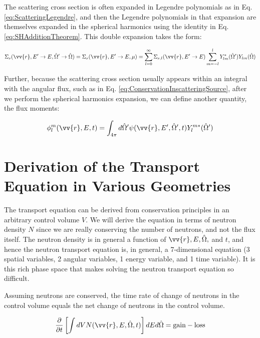 \documentclass[10pt]{article}
\begin{document}
\begin{flushleft}
The scattering cross section is often expanded in Legendre polynomials as in Eq. \ref{eq:ScatteringLegendre}, and then the Legendre polynomials in that expansion are themselves expanded in the spherical harmonics using the identity in Eq. \ref{eq:SHAdditionTheorem}. This double expansion takes the form:

\begin{equation}
\label{eq:ScatteringLegendreandSH}
\Sigma_s(\vv{r}, E'\rightarrow E, \hat{\Omega}'\rightarrow\hat{\Omega}) = \Sigma_s(\vv{r}, E'\rightarrow E, \mu) = \sum_{l=0}^{\infty} \Sigma_{s,l}(\vv{r}, E'\rightarrow E) \sum_{m=-l}^{l} Y_{lm}^{*} (\hat{\Omega}') Y_{lm}(\hat{\Omega})
\end{equation}

Further, because the scattering cross section usually appears within an integral with the angular flux, such as in Eq. \ref{eq:ConservationInscatteringSource}, after we perform the spherical harmonics expansion, we can define another quantity, the flux moments:

\begin{equation}
\label{eq:FluxMomentSH}
\phi_l^m(\vv{r}, E, t) = \int_{4\pi}^{} d\hat{\Omega}'\psi(\vv{r}, E', \hat{\Omega}', t)Y_l^{m*}(\hat{\Omega}')
\end{equation}

\section{Derivation of the Transport Equation in Various Geometries}

The transport equation can be derived from conservation principles in an arbitrary control volume \(V\). We will derive the equation in terms of neutron density \(N\) since we are really conserving the number of neutrons, and not the flux itself. The neutron density is in general a function of \(\vv{r}, E, \hat{\Omega}, \) and \(t\), and hence the neutron transport equation is, in general, a 7-dimensional equation (3 spatial variables, 2 angular variables, 1 energy variable, and 1 time variable). It is this rich phase space that makes solving the neutron transport equation so difficult. 

Assuming neutrons are conserved, the time rate of change of neutrons in the control volume equals the net change of neutrons in the control volume. 

\begin{equation}
\label{eq:Conservation1}
\frac{\partial}{\partial t} \left\lbrack\int dV N(\vv{r}, E, \hat{\Omega},t)\right\rbrack dEd\hat{\Omega} = \textrm{gain} - \textrm{loss}
\end{equation}


\end{flushleft}
\end{document}
